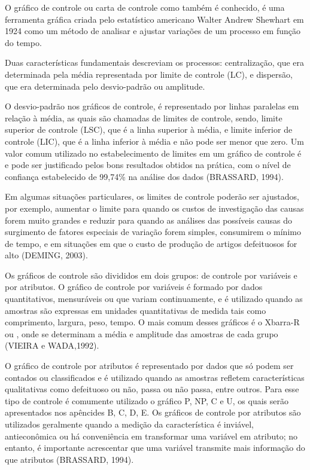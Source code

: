 \documentclass[
]{article}
\begin{document}
O gráfico de controle ou carta de controle como também é conhecido, é uma ferramenta gráfica criada pelo estatístico americano Walter Andrew Shewhart em 1924 como um método de analisar e ajustar variações de um processo em função do tempo.

Duas características fundamentais descreviam os processos: centralização, que era determinada pela média representada por limite de controle (LC), e dispersão, que era determinada pelo desvio-padrão ou amplitude.

O desvio-padrão nos gráficos de controle, é representado por linhas paralelas em relação à média, as quais são chamadas de limites de controle, sendo, limite superior de controle (LSC), que é a linha superior à média, e limite inferior de controle (LIC), que é a linha inferior à média e não pode ser menor que zero. Um valor comum utilizado no estabelecimento de limites em um gráfico de controle é e pode ser justificado pelos bons resultados obtidos na prática, com o nível de confiança estabelecido de 99,74\% na análise dos dados (BRASSARD, 1994).

Em algumas situações particulares, os limites de controle poderão ser ajustados, por exemplo, aumentar o limite para quando os custos de investigação das causas forem muito grandes e reduzir para quando as análises das possíveis causas do surgimento de fatores especiais de variação forem simples, consumirem o mínimo de tempo, e em situações em que o custo de produção de artigos defeituosos for alto (DEMING, 2003).

Os gráficos de controle são divididos em dois grupos: de controle por variáveis e por atributos. O gráfico de controle por variáveis é formado por dados quantitativos, mensuráveis ou que variam continuamente, e é utilizado quando as amostras são expressas em unidades quantitativas de medida tais como comprimento, largura, peso, tempo. O mais comum desses gráficos é o Xbarra-R ou , onde se determinam a média e amplitude das amostras de cada grupo (VIEIRA e WADA,1992).

O gráfico de controle por atributos é representado por dados que só podem ser contados ou classificados e é utilizado quando as amostras refletem características qualitativas como defeituoso ou não, passa ou não passa, entre outros. Para esse tipo de controle é comumente utilizado o gráfico P, NP, C e U, os quais serão apresentados nos apêncides B, C, D, E. Os gráficos de controle por atributos são utilizados geralmente quando a medição da característica é inviável, antieconômica ou há conveniência em transformar uma variável em atributo; no entanto, é importante acrescentar que uma variável transmite mais informação do que atributos (BRASSARD, 1994).
\end{document}
